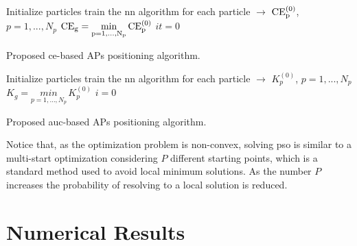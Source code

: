 \documentclass[conference,draftcls,onecolumn]{IEEEtran}
\begin{document}
 \begin{algorithm}[b!]

\small

  Initialize particles\;
  train the \ac{nn} algorithm for each particle $\to$ $\rm{CE}_p^{(0)}$, $p=1,...,N_p$\;
  $\rm{CE}_g=\underset{p=1,...,N_p}{min} \, \rm{CE}_p^{(0)}$\;
  $it = 0$\;

      
\caption{Proposed \ac{ce}-based APs positioning algorithm.}
 \end{algorithm}      

 \begin{algorithm}[b!]

\small

  Initialize particles\;      
      train the \ac{nn} algorithm for each particle $\to$ $K_p^{(0)}$, $p=1,...,N_p$\;
  $K_g=\underset{p=1,...,N_p}{min} \, K_p^{(0)}$\;
      $i = 0$\;
    
\caption{Proposed \ac{auc}-based APs positioning algorithm.}
 \end{algorithm}

Notice that, as the optimization problem is non-convex, solving \ac{pso} is similar to a multi-start optimization considering $P$ different starting points, which is a standard method used to avoid local minimum solutions. As the number $P$ increases the probability of resolving to a local solution is reduced.

\section{Numerical Results}\label{sec: nr}
\end{document}
